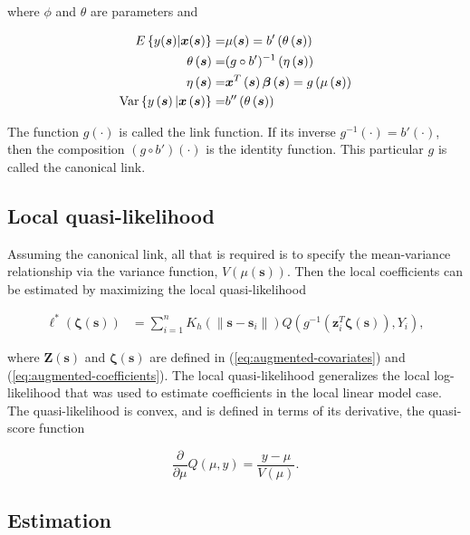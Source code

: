 \documentclass[authoryear,review, 12pt]{elsarticle}
\begin{document}
where $\phi$ and $\theta$ are parameters and

\begin{align*}
E\left\{ y(\bm{s})|\bm{x}(\bm{s})\right\} = & \mu(\bm{s})=b'\left(\theta\left(\bm{s}\right)\right)\\
\theta\left(\bm{s}\right)= & (g\circ b')^{-1}\left(\eta\left(\bm{s}\right)\right)\\
\eta\left(\bm{s}\right)= & \bm{x}^{T}\left(\bm{s}\right)\bm{\beta}\left(\bm{s}\right)=g\left(\mu\left(\bm{s}\right)\right)\\
\text{\text{Var}}\left\{ y\left(\bm{s}\right)|\bm{x}\left(\bm{s}\right)\right\} = & b''\left(\theta\left(\bm{s}\right)\right)
\end{align*}


The function $g(\cdot)$ is called the link function. If its inverse
$g^{-1}(\cdot)=b'(\cdot)$, then the composition $\left(g\circ b'\right)\left(\cdot\right)$
is the identity function. This particular $g$ is called the canonical
link. 


\subsection{Local quasi-likelihood}

Assuming the canonical link, all that is required is to specify the
mean-variance relationship via the variance function, $V\left(\mu\left(\bm{s}\right)\right)$.
Then the local coefficients can be estimated by maximizing the local
quasi-likelihood 

\begin{align}
\mathcal{\ell}^{*}\left(\bm{\zeta}(\bm{s})\right) & =\sum_{i=1}^{n}K_{h}\left(\|\bm{s}-\bm{s}_{i}\|\right)Q\left(g^{-1}\left(\bm{z}_{i}^{T}\bm{\zeta}(\bm{s})\right),Y_{i}\right),
\end{align}


where $\bm{Z}\left(\bm{s}\right)$ and $\bm{\zeta}\left(\bm{s}\right)$
are defined in (\ref{eq:augmented-covariates}) and (\ref{eq:augmented-coefficients}).
The local quasi-likelihood generalizes the local log-likelihood that
was used to estimate coefficients in the local linear model case.
The quasi-likelihood is convex, and is defined in terms of its derivative,
the quasi-score function

\[
\frac{\partial}{\partial\mu}Q\left(\mu,y\right)=\frac{y-\mu}{V\left(\mu\right)}.
\]



\subsection{Estimation}
\end{document}
